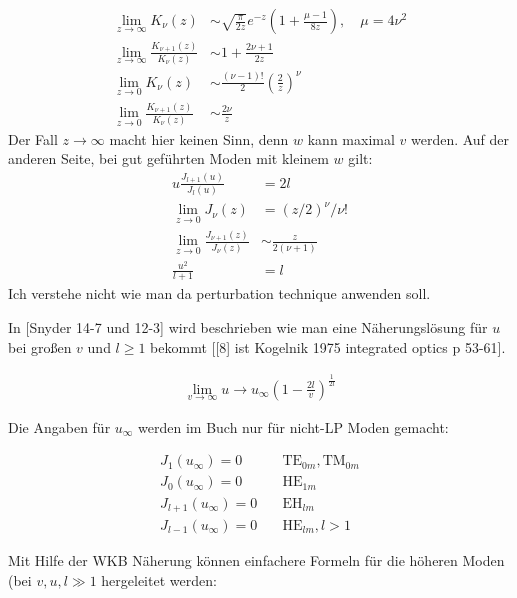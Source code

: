 \documentclass[DIV19,twocolumn]{scrartcl}
\def\({\left(}
\def\){\right)}
\begin{document}
\begin{align}
  \lim_{z\rightarrow \infty} K_\nu(z) &\sim \sqrt{\frac{\pi}{2z}} e^{-z}\(1+\frac{\mu-1}{8z}\), \quad \mu=4\nu^2 \\ %
  \lim_{z\rightarrow \infty} \frac{K_{\nu+1}(z)}{K_{\nu}(z)} &\sim 1+\frac{2\nu+1}{2z} \\
  \lim_{z\rightarrow 0} K_\nu(z) &\sim \frac{(\nu-1)!}{2} \(\frac{2}{z}\)^\nu \\ %
  \lim_{z\rightarrow 0     } \frac{K_{\nu+1}(z)}{K_{\nu}(z)} &\sim \frac{2\nu}{z}
\end{align}
Der Fall $z\rightarrow \infty$ macht hier keinen Sinn, denn $w$ kann
maximal $v$ werden.
Auf der anderen Seite, bei gut gef\"uhrten Moden mit kleinem $w$ gilt:
\begin{align}
  u\frac{J_{l+1}(u)}{J_l(u)}&=2l \\
  \lim_{z\rightarrow 0} J_\nu(z) &= (z/2)^\nu/\nu!  \\
    \lim_{z\rightarrow 0} \frac{J_{\nu+1}(z)}{J_{\nu}(z)} &\sim \frac{z}{2(\nu+1)} \\
    \frac{u^2}{l+1} &= l
\end{align}
Ich verstehe nicht wie man da perturbation technique anwenden soll.


In [Snyder 14-7 und 12-3] wird beschrieben wie man eine
N\"aherungsl\"osung f\"ur $u$ bei gro\ss en $v$ und $l\ge 1$ bekommt
[[8] ist Kogelnik 1975 integrated optics p 53-61].

\begin{align}
  \lim_{v\rightarrow\infty }u \rightarrow u_\infty \(1-\frac{2l}{v}\)^\frac{1}{2l}
\end{align}

Die Angaben f\"ur $u_\infty$ werden im Buch nur f\"ur nicht-LP Moden gemacht:

\begin{align}
  J_1(u_\infty) = 0  &\quad \textrm{TE}_{0m}, \textrm{TM}_{0m}\\
  J_0(u_\infty) = 0  &\quad \textrm{HE}_{1m}\\
J_{l+1}(u_\infty) = 0  &\quad \textrm{EH}_{lm}\\
J_{l-1}(u_\infty) = 0  &\quad \textrm{HE}_{lm}, l> 1
\end{align}

Mit Hilfe der WKB N\"aherung k\"onnen einfachere Formeln f\"ur die
h\"oheren Moden (bei $v,u,l\gg 1$ hergeleitet werden:
\end{document}
